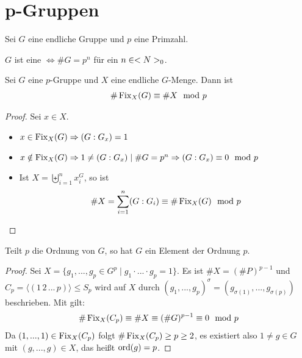 \section{p-Gruppen}

Sei $G$ eine endliche Gruppe und $p$ eine Primzahl.

\begin{definition}[$p$-Gruppe]
	$G$ ist eine  $\Leftrightarrow\#G=p^n$ für ein $n\in<N>_0$.
\end{definition}

\begin{proposition}
	Sei $G$ eine $p$-Gruppe und $X$ eine endliche $G$-Menge. Dann ist
	\begin{align}
		\#\operatorname{Fix}_X(G) \equiv \#X\mod p\notag
	\end{align}
\end{proposition}
\begin{proof}
	Sei $x\in X$.
	\begin{itemize}
		\item $x\in\operatorname{Fix}_X(G)\Rightarrow (G:G_x)=1$
		\item $x\notin\operatorname{Fix}_X(G)\Rightarrow 1\neq (G:G_x)\mid \#G=p^n\Rightarrow (G:G_x)\equiv 0\mod p$
		\item Ist $X=\biguplus_{i=1}^n x_i^G$, so ist
		\begin{align}
			\#X = \sum_{i=1}^n (G:G_i) \equiv \#\operatorname{Fix}_X(G)\mod p\notag
		\end{align}
	\end{itemize}
\end{proof}

\begin{conclusion}
	Teilt $p$ die Ordnung von $G$, so hat $G$ ein Element der Ordnung $p$.
\end{conclusion}
\begin{proof}
	Sei $X=\{g_1,...,g_p\in G^p\mid g_1\cdot ...\cdot g_p=1 \}$. Es ist $\#X=(\#P)^{p-1}$ und $C_p=\langle (1\, 2\, ...\, p)\rangle\le S_p$ wird auf $X$ durch $(g_1,...,g_p)^{\sigma}=(g_{\sigma(1)},...,g_{\sigma(p)})$ beschrieben. Mit  gilt:
	\begin{align}
		\#\operatorname{Fix}_X(C_p) \equiv \#X \equiv (\#G)^{p-1} \equiv 0\mod p\notag
	\end{align}
	Da $(1,...,1)\in \operatorname{Fix}_X(C_p)$ folgt $\#\operatorname{Fix}_X(C_p)\ge p\ge 2$, es existiert also $1\neq g\in G$ mit $(g,...,g)\in X$, das heißt $\operatorname{ord}(g)=p$.
\end{proof}

